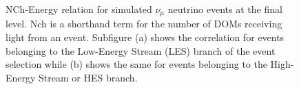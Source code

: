 \documentclass{gatech-thesis}
\begin{document}
\begin{figure}\label{fig:FL_nch_by_energy}
\centering
{}
\caption[Final Level NChannel-Energy Relation]{NCh-Energy relation for simulated $\nu_\mu$ neutrino events at the final level. Nch is a shorthand term for the number of DOMs receiving light from an event. Subfigure (a) shows the correlation for events belonging to the Low-Energy Stream (LES) branch of the event selection while (b) shows the same for events belonging to the High-Energy Stream or HES branch.} 
\end{figure}
\end{document}
